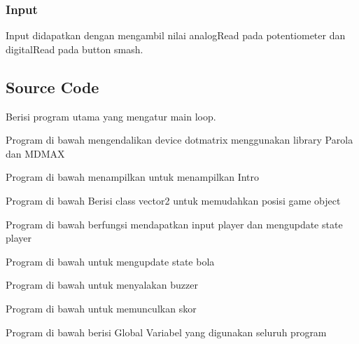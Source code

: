 \documentclass[a4paper,12pt]{article}
\begin{document}
\subsubsection{Input}
Input didapatkan dengan mengambil nilai analogRead pada potentiometer dan digitalRead pada button smash.
\subsection{Source Code}
Berisi program utama yang mengatur main loop.

Program di bawah mengendalikan device dotmatrix menggunakan library Parola dan MDMAX


Program di bawah menampilkan untuk menampilkan Intro


Program di bawah Berisi class vector2 untuk memudahkan posisi game object


Program di bawah berfungsi mendapatkan input player dan mengupdate state player


Program di bawah untuk mengupdate state bola


Program di bawah untuk menyalakan buzzer


Program di bawah untuk memunculkan skor


Program di bawah berisi Global Variabel yang digunakan seluruh program


\end{document}
